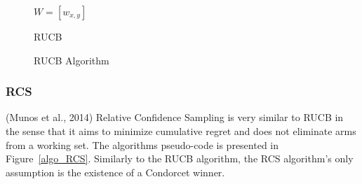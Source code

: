 \documentclass{llncs}
\begin{document}
	\begin{figure}[h]
	\IncMargin{1em}
		\begin{algorithm}[H]
		
		$ W = [w_{x,y}]$\\
		\BlankLine
			\caption{RUCB}
		\end{algorithm}
		\caption{RUCB Algorithm}\label{algo_RUCB}
	\end{figure}
	
	\newpage
\subsubsection{RCS}
	(Munos et al., 2014) Relative Confidence Sampling is very similar to RUCB in the sense that it aims to minimize cumulative regret and does not eliminate arms from a working set.
	The algorithms pseudo-code is presented in Figure~\ref{algo_RCS}.
	Similarly to the RUCB algorithm, the RCS algorithm's only assumption is the existence of a Condorcet winner.
	
\end{document}
